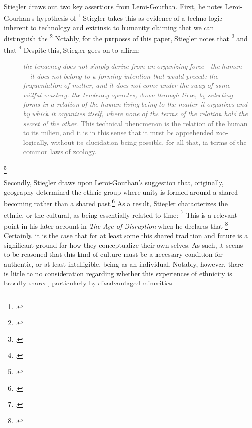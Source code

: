 \documentclass[letterpaper,notitlepage,12pt]{article}
\begin{document}
Stiegler draws out two key assertions from Leroi-Gourhan.
First, he notes Leroi-Gourhan's hypothesis of \footcite[p. 43]{stiegler_technics_1998}
Stiegler takes this as evidence of a techno-logic inherent to technology and
extrinsic to humanity claiming that we can distinguish the
\footcite[p. 44]{stiegler_technics_1998}
Notably, for the purposes of this paper, Stiegler notes that \footcite[p. 44]{stiegler_technics_1998} and that \footcite[p.
46]{stiegler_technics_1998}
Despite this, Stiegler goes on to affirm: \blockquote{\textit{the tendency does 
    not simply derive from an organizing force---the human---it does not belong 
    to a forming intention that would precede the frequentation of matter, and 
    it does not come under the sway of some willful mastery: the tendency 
    operates, down through time, by selecting forms in a relation of the human 
    living being to the matter it organizes and by which it organizes itself, 
  where none of the terms of the relation hold the secret of the other.} This 
    technical phenomenon is the relation of the human to its milieu, and it is 
    in this sense that it must be apprehended zoo-logically, without its 
    elucidation being possible, for all that, in terms of the common laws of
  zoology.}\footcite[p. 49]{stiegler_technics_1998}

Secondly, Stiegler draws upon Leroi-Gourhan's suggestion that, originally,
geography determined the ethnic group where unity is formed around a shared
becoming rather than a shared past.\footcite[p. 55--8]{stiegler_technics_1998}
As a result, Stiegler characterizes the ethnic, or the cultural, as being
essentially related to time: \footcite[p.
55]{stiegler_technics_1998}
This is a relevant point in his later account in \textit{The Age of Disruption}
when he declares that \footcite[ch.
2.7]{stiegler_age_2019}
Certainly, it is the case that for at least some this shared tradition and
future is a significant ground for how they conceptualize their own selves.
As such, it seems to be reasoned that this kind of culture must be a necessary
condition for authentic, or at least intelligible, being as an individual.
Notably, however, there is little to no consideration regarding whether this
experiences of ethnicity is broadly shared, particularly by disadvantaged
minorities.
\end{document}
